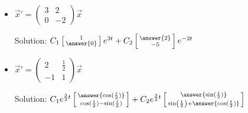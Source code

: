 \documentclass{ximera}
\begin{document}
\begin{exercise}
\begin{itemize}
        \item $\vec{x}'=\begin{pmatrix} 3& 2\\ 0&-2 \end{pmatrix}\vec{x}$ %
            \begin{multipleChoice}
            \end{multipleChoice}
            Solution: $C_1\left[\begin{smallmatrix} 1 \\ \answer{0} \end{smallmatrix}\right]e^{3t} + C_2\left[\begin{smallmatrix} \answer{2} \\ -5 \end{smallmatrix}\right]e^{-2t}$  \\
            
        \item $\vec{x}'=\begin{pmatrix} 2& \frac{1}{2} \\-1 & 1  \end{pmatrix}\vec{x}$ %
            \begin{multipleChoice}
            \end{multipleChoice}
            Solution: $C_1e^{\frac{3}{2}t}\left[\begin{smallmatrix} \answer{\cos(\frac{t}{2})} \\ \cos(\frac{t}{2}) - \sin(\frac{t}{2}) \end{smallmatrix}\right] + C_2e^{\frac{3}{2}t}\left[\begin{smallmatrix} \answer{\sin(\frac{t}{2})} \\ \sin\left(\frac{t}{2}\right) + \answer{\cos(\frac{t}{2})} \end{smallmatrix}\right]$  \\
            

\end{itemize}
\end{exercise}
\end{document}
